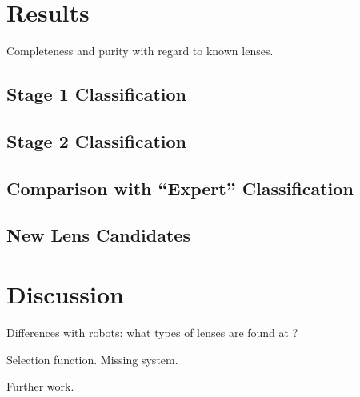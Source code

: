 \documentclass[useAMS,usenatbib,a4paper]{mn2e}
\begin{document}

\section{Results}
\label{sec:results}

Completeness and purity with regard to known lenses.


\subsection{Stage 1 Classification}
\label{sec:results:stage1}



\subsection{Stage 2 Classification}
\label{sec:results:stage2}



\subsection{Comparison with ``Expert'' Classification}
\label{sec:results:experts}



\subsection{New Lens Candidates}
\label{sec:results:newlenses}



\section{Discussion}
\label{sec:discuss}

Differences with robots: what types of lenses are found at \sw?

Selection function. Missing system.

Further work.
\end{document}
